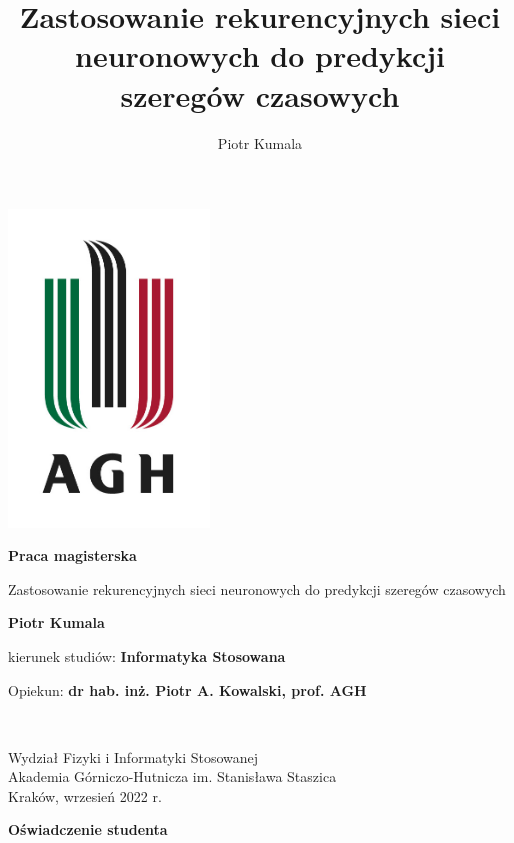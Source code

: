 \documentclass[10pt,a4paper]{article}
\author{Piotr Kumala}
\title{Zastosowanie rekurencyjnych sieci neuronowych do predykcji szeregów czasowych}
\date{}
\begin{document}
\begin{titlepage}
	\begin{center}
		\includegraphics[width=0.4\textwidth]{img/university.jpg}
		\vspace*{1cm}
		
		{\Huge
			\textbf{Praca magisterska} \\
			
		}
		\vspace{0.5cm}
		{\Large
			Zastosowanie rekurencyjnych sieci neuronowych do predykcji szeregów czasowych
			
			\vspace{1cm}
			
			\textbf{Piotr Kumala} \\
		}
		\vspace{0.5cm}
		kierunek studiów: \textbf{Informatyka Stosowana} \\
		
		\vspace{1cm}
		
		{\Large Opiekun: \textbf{dr hab. inż. Piotr A. Kowalski, prof. AGH}}
		\vfill
		
		\
		\vspace{0.8cm}
		
		
		Wydział Fizyki i Informatyki Stosowanej\\
		Akademia Górniczo-Hutnicza im. Stanisława Staszica\\
		Kraków, wrzesień 2022 r.
		
	\end{center}
\end{titlepage}
\newpage
\begin{center}
	\textbf{Oświadczenie studenta}
\end{center}
\end{document}
